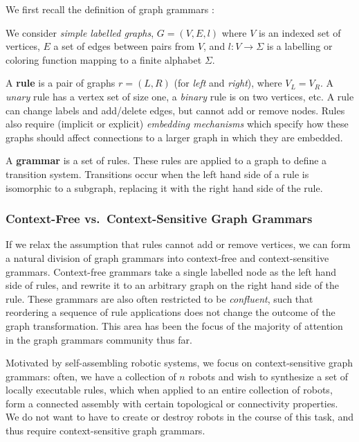 \documentclass[]{article}
\begin{document}
We first recall the definition of graph grammars \cite{litovsky}
\cite{klavins}:

We consider \emph{simple labelled graphs}, \(G = (V,E,l)\) where \(V\)
is an indexed set of vertices, \(E\) a set of edges between pairs from
\(V\), and \(l: V \to \Sigma\) is a labelling or coloring function mapping to a
finite alphabet $\Sigma$.

A \textbf{rule} is a pair of graphs \(r=(L,R)\) (for \emph{left} and
\emph{right}), where \(V_L = V_R\). A \emph{unary} rule has a vertex set
of size one, a \emph{binary} rule is on two vertices, etc. A rule can
change labels and add/delete edges, but cannot add or remove nodes.
Rules also require (implicit or explicit) \emph{embedding mechanisms}
which specify how these graphs should affect connections to a larger
graph in which they are embedded.

A \textbf{grammar} is a set of rules. These rules are applied
 to a graph to define a transition system. Transitions occur
when the left hand side of a rule is isomorphic to a subgraph, replacing it 
with the right hand side of the rule.

\subsubsection{Context-Free vs.~Context-Sensitive Graph
Grammars}\label{context-free-vs.context-sensitive-graph-grammars}

If we relax the assumption that rules cannot add or remove vertices, we
can form a natural division of graph grammars into context-free and
context-sensitive grammars. Context-free grammars take a single labelled
node as the left hand side of rules, and rewrite it to an arbitrary graph on
the right hand side of the rule. These grammars are also
often restricted to be \emph{confluent}, such that reordering a
sequence of rule applications does not change the outcome of the graph
transformation. This area has been the focus of the majority of
attention in the graph grammars community thus far.

Motivated by self-assembling robotic systems, we focus on context-sensitive
graph grammars: often, we have a collection of $n$ robots and wish to synthesize a
set of locally executable rules, which when applied to an entire collection of
robots, form a connected assembly with certain topological or connectivity
properties. We do not want to have to create or destroy robots in the course of
this task, and thus require context-sensitive graph grammars.
\end{document}
